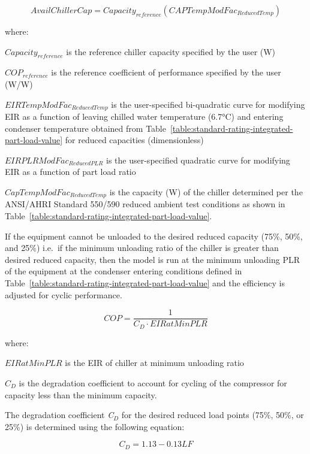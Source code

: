 \begin{equation}
AvailChillerCap = Capacit{y_{reference}}(CAPTempModFa{c_{ReducedTemp}})
\end{equation}

where:

\(Capacit{y_{reference}}\) is the reference chiller capacity specified by the user (W)

\(CO{P_{reference}}\) is the reference coefficient of performance specified by the user (W/W)

\(EIRTempModFa{c_{ReducedTemp}}\) is the user-specified bi-quadratic curve for modifying EIR as a function of leaving chilled water temperature (6.7°C) and entering condenser temperature obtained from Table~\ref{table:standard-rating-integrated-part-load-value} for reduced capacities (dimensionless)

\(EIRPLRModFa{c_{ReducedPLR}}\) is the user-specified quadratic curve for modifying EIR as a function of part load ratio

\(CapTempModFa{c_{ReducedTemp}}\) is the capacity (W) of the chiller determined per the ANSI/AHRI Standard 550/590 reduced ambient test conditions as shown in Table~\ref{table:standard-rating-integrated-part-load-value}.

If the equipment cannot be unloaded to the desired reduced capacity (75\%, 50\%, and 25\%) i.e.~if the minimum unloading ratio of the chiller is greater than desired reduced capacity, then the model is run at the minimum unloading PLR of the equipment at the condenser entering conditions defined in Table~\ref{table:standard-rating-integrated-part-load-value} and the efficiency is adjusted for cyclic performance.

\begin{equation}
COP = \frac{{\mathrm{1}}}{{{C_D} \cdot EIRatMinPLR}}
\end{equation}

where:

\(EIRatMinPLR\) is the EIR of chiller at minimum unloading ratio

\({C_D}\) is the degradation coefficient to account for cycling of the compressor for capacity less than the minimum capacity.

The degradation coefficient \emph{C\(_{D}\)} for the desired reduced load points (75\%, 50\%, or 25\%) is determined using the following equation:

\begin{equation}
{C_D} = 1.13 - 0.13LF
\end{equation}


